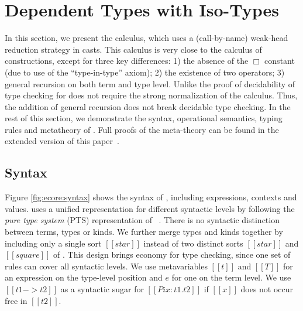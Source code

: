 
\section{Dependent Types with Iso-Types}\label{sec:ecore}

In this section, we present the \ecore calculus, which uses a
(call-by-name) weak-head reduction strategy in casts. This calculus is very
close to the calculus of constructions, except for three key differences:
1) the absence of the $\Box$ constant (due to use of the
``type-in-type'' axiom); 2) the existence of two \cast operators; 3)
general recursion on both term and type level.
Unlike \cc the proof of 
decidability of type checking for \ecore does not require the strong normalization of the
calculus. Thus, the addition of general recursion does not break decidable
type checking. In the rest of this section, we demonstrate the syntax,
operational semantics, typing rules and metatheory of \ecore.
Full proofs of the meta-theory can be found in the extended version of
this paper~\cite{full}.

\subsection{Syntax}\label{sec:ecore:syn}

Figure \ref{fig:ecore:syntax} shows the syntax of \ecore, including
expressions, contexts and values. \ecore uses a unified 
representation for different syntactic levels by following the
\emph{pure type system} (PTS) representation of \cc~\cite{handbook}. There
is no syntactic distinction between terms, types or kinds.
We further merge types and
kinds together by including only a single sort $[[star]]$ instead of two distinct sorts $[[star]]$ and
$[[square]]$ of \cc.
This design
brings economy for type checking, since one set of rules can cover
all syntactic levels. We use metavariables $[[t]]$ and
$[[T]]$ for an expression on the type-level position and $e$ for one
on the term level. We use $[[t1 -> t2]]$ as a syntactic sugar for
$[[Pi x:t1.t2]]$ if $[[x]]$ does not occur free in $[[t2]]$.


